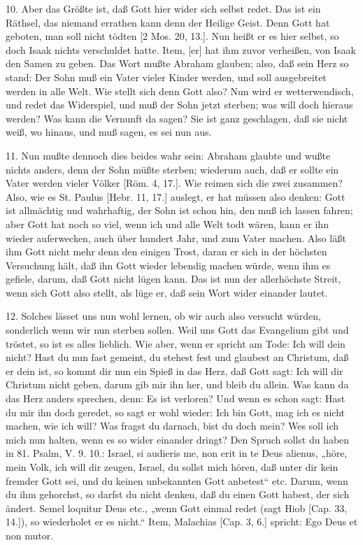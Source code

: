 10. Aber das Größte ist, daß Gott hier wider sich selbst redet. Das ist ein Räthsel, das niemand errathen kann denn der Heilige Geist. Denn Gott hat geboten, man soll nicht tödten [2 Mos. 20, 13.]. Nun heißt er es hier selbst, so doch Isaak nichts verschuldet hatte. Item, [er] hat ihm zuvor verheißen, von Isaak den Samen zu geben. Das Wort mußte Abraham glauben; also, daß sein Herz so stand: Der Sohn muß ein Vater vieler Kinder werden, und soll ausgebreitet werden in alle Welt. Wie stellt sich denn Gott also? Nun wird er wetterwendisch, und redet das Widerspiel, und muß der Sohn jetzt sterben; was will doch hieraus werden? Was kann die Vernunft da sagen? Sie ist ganz geschlagen, daß sie nicht weiß, wo hinaus, und muß sagen, es sei nun aus.

11. Nun mußte dennoch dies beides wahr sein: Abraham glaubte und wußte nichts anders, denn der Sohn müßte sterben; wiederum auch, daß er sollte ein Vater werden vieler Völker [Röm. 4, 17.]. Wie reimen sich die zwei zusammen? Also, wie es St. Paulus [Hebr. 11, 17.] auslegt, er hat müssen also denken: Gott ist allmächtig und wahrhaftig, der Sohn ist schon hin, den muß ich lassen fahren; aber Gott hat noch so viel, wenn ich und alle Welt todt wären, kann er ihn wieder auferwecken, auch über hundert Jahr, und zum Vater machen. Also läßt ihm Gott nicht mehr denn den einigen Trost, daran er sich in der höchsten Versuchung hält, daß ihn Gott wieder lebendig machen würde, wenn ihm es gefiele, darum, daß Gott nicht lügen kann. Das ist nun der allerhöchste Streit, wenn sich Gott also stellt, als lüge er, daß sein Wort wider einander lautet.

12. Solches lässet uns nun wohl lernen, ob wir auch also versucht würden, sonderlich wenn wir nun sterben sollen. Weil uns Gott das Evangelium gibt und tröstet, so ist es alles lieblich. Wie aber, wenn er spricht am Tode: Ich will dein nicht? Hast du nun fast gemeint, du stehest fest und glaubest an Christum, daß er dein ist, so kommt dir nun ein Spieß in das Herz, daß Gott sagt: Ich will dir Christum nicht geben, darum gib mir ihn her, und bleib du allein. Was kann da das Herz anders sprechen, denn: Es ist verloren? Und wenn es schon sagt: Hast du mir ihn doch geredet, so sagt er wohl wieder: Ich bin Gott, mag ich es nicht machen, wie ich will? Was fragst du darnach, bist du doch mein? Wes soll ich mich nun halten, wenn es so wider einander dringt? Den Spruch sollst du haben in 81. Psalm, V. 9. 10.: Israel, si audieris me, non erit in te Deus alienus, „höre, mein Volk, ich will dir zeugen, Israel, du sollst mich hören, daß unter dir kein fremder Gott sei, und du keinen unbekannten Gott anbetest“ etc. Darum, wenn du ihm gehorchst, so darfst du nicht denken, daß du einen Gott habest, der sich ändert. Semel loquitur Deus etc., „wenn Gott einmal redet (sagt Hiob [Cap. 33, 14.]), so wiederholet er es nicht.“ Item, Malachias [Cap. 3, 6.] spricht: Ego Deus et non mutor.

